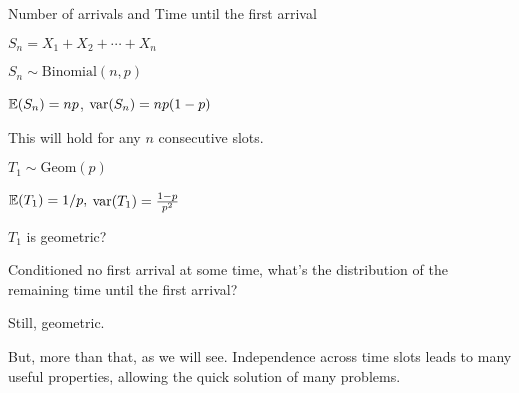 
\begin{frame}{Number of arrivals and Time until the first arrival}

{
\plitemsep 0.1in

\bci
\item<2-> $S_n = X_1 + X_2 +\cdots + X_n$

\item<3-> $S_n \sim \text{Binomial}(n,p)$

\item<4-> $\mathbb{E}( S_n ) = np$, $\text{var}( S_n ) = np(1-p)$

\item<5-> This will hold for any $n$ consecutive slots.


  \eci

\bigskip
{}
\bci
\item<6-> $T_1 \sim \text{Geom}(p)$
\item<7-> $\mathbb{E}( T_1 ) = 1/p,$ $\text{var}( T_1 ) = \frac{1-p}{p^2}$
\eci
}
{
\plitemsep 0.1in
\bci
\item<8-> $T_1$ is geometric? 

\item<9-> Conditioned no first arrival at some time, what's the distribution of the remaining time until the first arrival?

\item<9-> Still, geometric.

\item<10-> But, more than that, as we will see. Independence across time slots leads to many useful properties, allowing the quick solution of many problems.

\eci

}

\end{frame}

